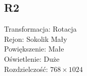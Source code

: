 \subsection{R2}
Transformacja: Rotacja\\
Rejon: Sokolik Mały\\
Powiększenie: Małe\\
Oświetlenie: Duże\\
Rozdzielczość: $768 \times 1024$\\
\begin{figure}[!htb]
\begin{center}
\end{center}
\end{figure}
